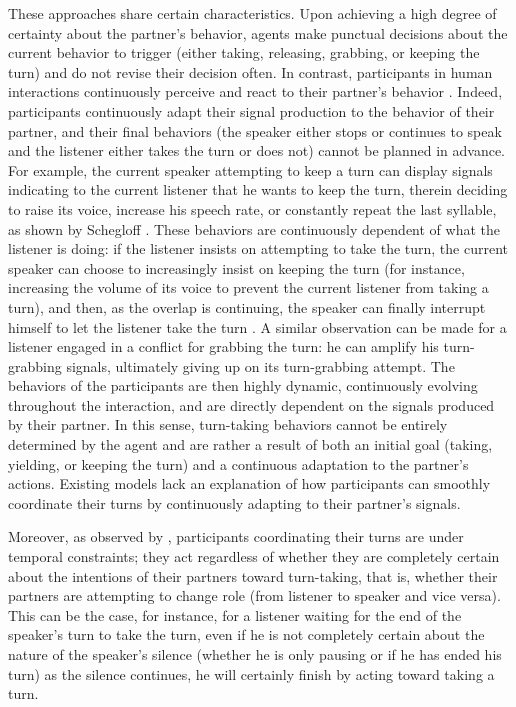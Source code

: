 \documentclass[twocolumn]{svjour3}
\begin{document}
These approaches share certain characteristics. Upon achieving a high degree of certainty about the partner's behavior, agents make punctual decisions about the current behavior to trigger (either taking, releasing, grabbing, or keeping the turn) and do not  revise their decision often.
In contrast, participants in human interactions continuously perceive and react to their partner's behavior \citep{clancy_co-constructed_2015}. Indeed, participants continuously adapt their signal production to the behavior of their partner, and their final behaviors (the speaker either stops or continues to speak and the listener either takes the turn or does not) cannot be planned in advance. For example, the current speaker attempting to keep a turn can display signals indicating to the current listener that he wants to keep the turn, therein deciding to raise its voice, increase his speech rate, or constantly repeat the last syllable, as shown by Schegloff \citep{schegloff_overlapping_2000}. These behaviors are continuously dependent of what the listener is doing: if the listener insists on attempting to take the turn, the current speaker can choose to increasingly insist on keeping the turn (for instance,  increasing the volume of its voice to prevent the current listener from taking a turn), and then, as the overlap is continuing, the speaker can finally interrupt himself to let the listener take the turn \citep{schegloff_overlapping_2000}.  
A similar observation can be made for a listener engaged in a conflict for grabbing the turn: he can amplify his turn-grabbing signals, ultimately giving up on its turn-grabbing attempt.
The behaviors of the participants are then highly dynamic, continuously evolving throughout the interaction, and are directly dependent on the signals produced by their partner. In this sense, turn-taking behaviors cannot be entirely determined by the agent and are rather  a result of both an initial goal (taking, yielding, or keeping the turn) and a continuous adaptation to the partner's actions. Existing models lack an explanation of how participants can smoothly coordinate their turns by continuously adapting to their partner's signals.  
 
Moreover, as observed by \cite{thorisson_natural_2002}, participants coordinating their turns are under temporal constraints; they act regardless of whether they are completely certain about the intentions of their partners toward turn-taking, that is, whether their partners are attempting to change role (from listener to speaker and vice versa). This can be the case, for instance, for a listener waiting for the end of the speaker's turn to take the turn, even if he is not completely certain about the nature of the speaker's silence (whether he is only pausing or if he has ended his turn) as the silence continues, he will certainly finish by acting toward taking a turn.
 	
\end{document}
